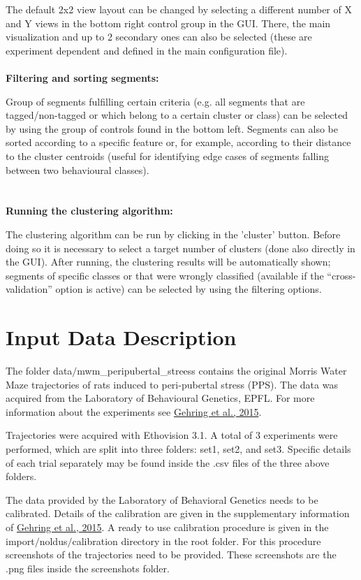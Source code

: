 \documentclass[12pt,titlepage]{article}
\begin{document}
\begin{doublespace}
The default 2x2 view layout can be changed by selecting a different number of X and Y views in the bottom right control group in the GUI. There, the main visualization and up to 2 secondary ones can also be selected (these are experiment dependent and defined in the main configuration file).
\\
\\
\noindent\textbf{Filtering and sorting segments:}

Group of segments fulfilling certain criteria (e.g. all segments that are tagged/non-tagged or which belong to a certain cluster or class) can be selected by using the group of controls found in the bottom left. Segments can also be sorted according to a specific feature or, for example, according to their distance to the cluster centroids (useful for identifying edge cases of segments falling between two behavioural classes).
\\
\\
\\
\textbf{Running the clustering algorithm:}

The clustering algorithm can be run by clicking in the 'cluster' button. Before doing so it is necessary to select a target number of clusters (done also directly in the GUI). After running, the clustering results will be automatically shown; segments of specific classes or that were wrongly classified (available if the “cross-validation” option is active) can be selected by using the filtering options.


\section{Input Data Description}

The folder data$/$mwm\_peripubertal\_streess contains the original Morris Water Maze trajectories of rats induced to peri-pubertal stress (PPS). The data was acquired from the Laboratory of Behavioural Genetics, EPFL. For more information about the experiments see \href{http://www.nature.com/articles/srep14562}{Gehring et al., 2015}.

Trajectories were acquired with Ethovision 3.1. A total of 3 experiments were performed, which are split into three folders: set1, set2, and set3. Specific details of each trial separately may be found inside the .csv files of the three above folders.

The data provided by the Laboratory of Behavioral Genetics needs to be calibrated. Details of the calibration are given in the supplementary information of \href{http://www.nature.com/articles/srep14562}{Gehring et al., 2015}. A ready to use calibration procedure is given in the import$/$noldus$/$calibration directory in the root folder.  For this procedure screenshots of the trajectories need to be provided. These screenshots are the .png files inside the screenshots folder.


\end{doublespace}
\end{document}
